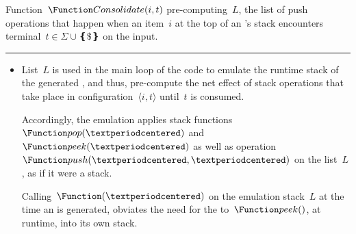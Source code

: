 \begin{algorithm}[htb]
  \caption{\label{algorithm:consolidate}
    Function~$\Function Consolidate(i,t)$ pre-computing~$L$, the list of push
    operations that happen when an item~$i$ at the top of an \RLLp's stack
    encounters terminal~$t∈Σ∪❴\$❵$ on the input.
  }
  \begin{algorithmic}
     
     
       
       
        \ENDWHILE
         
         
         
      \FI
       
    \ENDWHILE
     
     
  \end{algorithmic}
  \vspace{0.3ex}
  \hrule
  \vspace{0.3ex}
  \scriptsize
  \begin{itemize}
    \item List~$L$ is used in the main loop of the code to emulate the
          runtime stack of the generated \RLLp, and thus, pre-compute the net effect
          of stack operations that take place in
          configuration~$⟨i,t⟩$ until~$t$ is consumed.
          \par
          Accordingly, the emulation applies stack
          functions~$\Function pop(·)$ and~$\Function peek(·)$
          as well as operation~$\Function push(·,·)$ on the list~$L$,
          as if it were a stack.
          \par
          Calling~$\Function (·)$ on the emulation stack~$L$ at the time an
          \RLLp is generated, obviates the need for the \RLLp to~$\Function
          peek()$, at runtime, into its own stack.

\end{itemize}
\end{algorithm}
